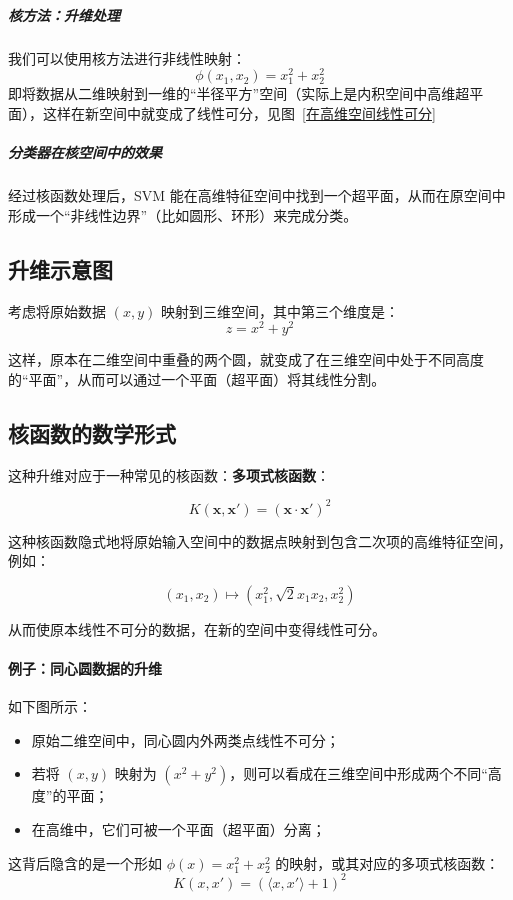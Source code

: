 {\subparagraph*{核方法：升维处理}

我们可以使用核方法进行非线性映射：
\[
\phi(x_1, x_2) = x_1^2 + x_2^2
\]
即将数据从二维映射到一维的“半径平方”空间（实际上是内积空间中高维超平面），这样在新空间中就变成了线性可分，见图~\ref{在高维空间线性可分}
\subparagraph*{分类器在核空间中的效果}

经过核函数处理后，SVM 能在高维特征空间中找到一个超平面，从而在原空间中形成一个“非线性边界”（比如圆形、环形）来完成分类。


\subsection{升维示意图}

考虑将原始数据 \((x, y)\) 映射到三维空间，其中第三个维度是：
\[
z = x^2 + y^2
\]

这样，原本在二维空间中重叠的两个圆，就变成了在三维空间中处于不同高度的“平面”，从而可以通过一个平面（超平面）将其线性分割。


\subsection{核函数的数学形式}

这种升维对应于一种常见的核函数：\textbf{多项式核函数}：

\[
K(\mathbf{x}, \mathbf{x}') = (\mathbf{x} \cdot \mathbf{x}')^2
\]

这种核函数隐式地将原始输入空间中的数据点映射到包含二次项的高维特征空间，例如：

\[
(x_1, x_2) \mapsto (x_1^2, \sqrt{2}x_1 x_2, x_2^2)
\]

从而使原本线性不可分的数据，在新的空间中变得线性可分。


\paragraph{例子：同心圆数据的升维}
如下图所示：

\begin{itemize}
    \item 原始二维空间中，同心圆内外两类点线性不可分；
    \item 若将 $(x, y)$ 映射为 $(x^2 + y^2)$，则可以看成在三维空间中形成两个不同“高度”的平面；
    \item 在高维中，它们可被一个平面（超平面）分离；
\end{itemize}

这背后隐含的是一个形如 $\phi(x) = x_1^2 + x_2^2$ 的映射，或其对应的多项式核函数：
\[
K(x, x') = (\langle x, x' \rangle + 1)^2
\]

}
